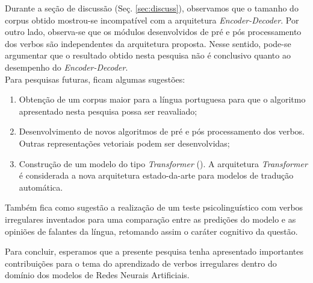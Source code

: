 Durante a seção de discussão (Seç. \ref{sec:discuss}), observamos que o tamanho do corpus obtido mostrou-se incompatível com a arquitetura \textit{Encoder-Decoder}. Por outro lado, observa-se que os módulos desenvolvidos de pré e pós processamento dos verbos são independentes da arquitetura proposta. Nesse sentido, pode-se argumentar que o resultado obtido nesta pesquisa não é conclusivo quanto ao desempenho do \textit{Encoder-Decoder}. \\

Para pesquisas futuras, ficam algumas sugestões:

\begin{enumerate}

\item Obtenção de um corpus maior para a língua portuguesa
para que o algoritmo apresentado nesta pesquisa possa ser reavaliado;

\item Desenvolvimento de novos algoritmos de pré e pós processamento dos verbos. Outras representações vetoriais%
podem ser desenvolvidas; 

\item Construção de um modelo do tipo \textit{Transformer} (\cite{Vaswani2017AttentionIA}). A arquitetura \textit{Transformer} é considerada a nova arquitetura estado-da-arte para modelos de tradução automática. 

\end{enumerate}

Também fica como sugestão a realização de um teste psicolinguístico com verbos irregulares inventados para uma comparação entre as predições do modelo e as opiniões de falantes da língua, retomando assim o caráter cognitivo da questão. 

Para concluir, esperamos que a presente pesquisa tenha apresentado importantes contribuições para o tema do aprendizado de verbos irregulares dentro do domínio dos modelos de Redes Neurais Artificiais. 